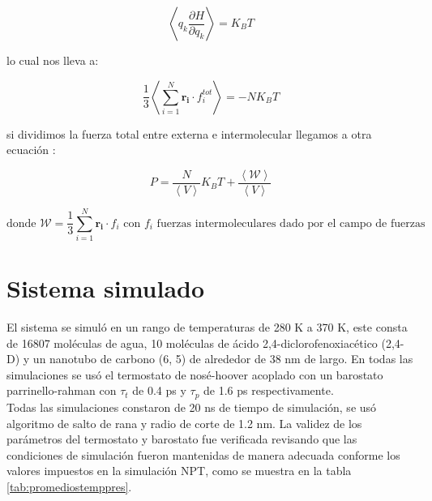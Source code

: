 \begin{equation} \label{virialtheoremq}
    \left \langle q_k \frac{\partial H}{\partial q_k} \right \rangle = K_B T
\end{equation}

lo cual nos lleva a:

\begin{equation} \label{virialtheorempress}
    \frac{1}{3}\left \langle \sum_{i=1}^N \mathbf{r_i} \cdot f^{tot}_i \right \rangle = -N K_B T
\end{equation}

si dividimos la fuerza total entre externa e intermolecular llegamos a otra ecuación \cite{Allen2017}:

\begin{equation} \label{virialsumconstpress}
    P = \frac{N}{\left \langle V \right \rangle} K_B T + \frac{\left \langle \mathcal{W} \right \rangle}{\left \langle V \right \rangle}
\end{equation}

\begin{equation*}
     \text{donde } \mathcal{W} = \frac{1}{3} \sum_{i=1}^N \mathbf{r_i} \cdot f_i \text{ con $f_i$ fuerzas intermoleculares dado por el campo de fuerzas}
\end{equation*}

\section{Sistema simulado}

El sistema se simuló en un rango de temperaturas de 280 K a 370 K, este consta de 16807 moléculas de agua, 10 moléculas de ácido 2,4-diclorofenoxiacético (2,4-D) y un nanotubo de carbono (6, 5) de alrededor de 38 nm de largo. En todas las simulaciones se usó el termostato de nosé-hoover acoplado con un barostato parrinello-rahman con $\tau_t$ de 0.4 ps y $\tau_p$ de 1.6 ps respectivamente.\\

Todas las simulaciones constaron de 20 ns de tiempo de simulación, se usó algoritmo de salto de rana y radio de corte de 1.2 nm. La validez de los parámetros del termostato y barostato fue verificada revisando que las condiciones de simulación fueron mantenidas de manera adecuada conforme los valores impuestos en la simulación NPT, como se muestra en la tabla \ref{tab:promediostemppres}.

